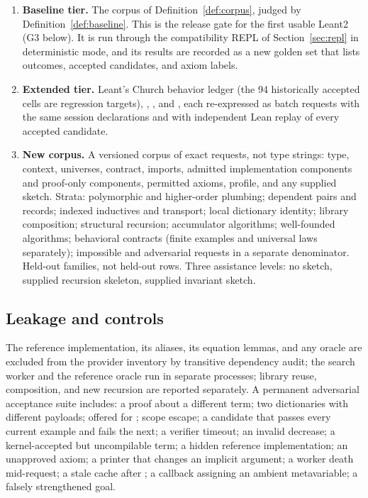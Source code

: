 \begin{enumerate}
\item \textbf{Baseline tier.} The corpus of Definition~\ref{def:corpus}, judged by Definition~\ref{def:baseline}. This is the release gate for the first usable Leant2 (G3 below). It is run through the compatibility REPL of Section~\ref{sec:repl} in deterministic mode, and its results are recorded as a new golden set that lists outcomes, accepted candidates, and axiom labels.
\item \textbf{Extended tier.} Leant's Church behavior ledger (the 94 historically accepted cells are regression targets), , , and , each re-expressed as batch requests with the same session declarations and with independent Lean replay of every accepted candidate.
\item \textbf{New corpus.} A versioned corpus of exact requests, not type strings: type, context, universes, contract, imports, admitted implementation components and proof-only components, permitted axioms, profile, and any supplied sketch. Strata: polymorphic and higher-order plumbing; dependent pairs and records; indexed inductives and transport; local dictionary identity; library composition; structural recursion; accumulator algorithms; well-founded algorithms; behavioral contracts (finite examples and universal laws separately); impossible and adversarial requests in a separate denominator. Held-out families, not held-out rows. Three assistance levels: no sketch, supplied recursion skeleton, supplied invariant sketch.
\end{enumerate}

\subsection{Leakage and controls}

The reference implementation, its aliases, its equation lemmas, and any oracle are excluded from the provider inventory by transitive dependency audit; the search worker and the reference oracle run in separate processes; library reuse, composition, and new recursion are reported separately. A permanent adversarial acceptance suite includes: a proof about a different term; two  dictionaries with different payloads;  offered for ; scope escape; a candidate that passes every current example and fails the next; a verifier timeout; an invalid decrease; a kernel-accepted but uncompilable term; a hidden reference implementation; an unapproved axiom; a printer that changes an implicit argument; a worker death mid-request; a stale cache after ; a callback assigning an ambient metavariable; a falsely strengthened goal.

